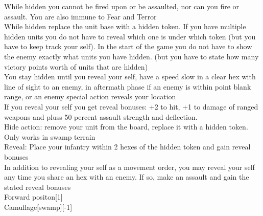 While hidden you cannot be fired upon or be assaulted, nor can you fire or assault. You are also immune to Fear and Terror\\ 
While hidden replace the unit base with a hidden token. If you have multiple hidden units you do not have to reveal which one is under which token (but you have to keep track your self). In the start of the game you do not have to show the enemy exactly what units you have hidden. (but you have to state how many victory points worth of units that are hidden)\\ 
You stay hidden until you reveal your self, have a speed slow in a clear hex with line of sight to an enemy, in aftermath phase if an enemy is within point blank range, or an enemy special action reveals your location\\ 
If you reveal your self you get reveal bonuses: +2 to hit, +1 to damage of ranged weapons and pluss 50 percent assault strength and deflection.\\ 
Hide action: remove your unit from the board, replace it with a hidden token. Only works in swamp terrain\\ 
Reveal: Place your infantry within 2 hexes of the hidden token and gain reveal bonuses\\ 
In addition to revealing your self as a movement order, you may reveal your self any time you share an hex with an enemy. If so, make an assault and gain the stated reveal bonuses\\ 
Forward positon[1]\\ 
Camuflage[swamp][-1]\\ 





 
\ \\



